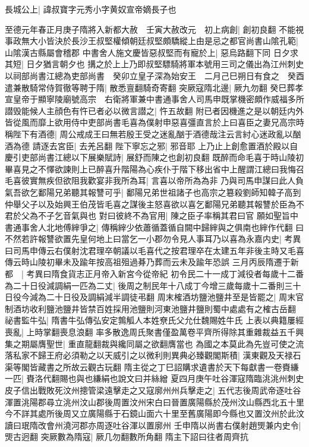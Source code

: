 長城公上|{
	諱叔寶字元秀小字黄奴宣帝嫡長子也}


至德元年春正月庚子隋將入新都大赦　壬寅大赦改元　初上病創|{
	創初良翻}
不能視事政無大小皆決於長沙王叔堅權傾朝廷叔堅頗驕縱上由是忌之都官尚書山隂孔範|{
	山隂漢古縣屬會稽郡}
中書舍人施文慶皆惡叔堅而有寵於上|{
	惡烏路翻下同}
日夕求其短|{
	日夕猶言朝夕也}
搆之於上上乃即叔堅驃騎將軍本號用三司之儀出為江州刺史以祠部尚書江總為吏部尚書　癸卯立皇子深為始安王　二月己巳朔日有食之　癸酉遣兼散騎常侍賀徹等聘于隋|{
	散悉亶翻騎奇寄翻}
突厥寇隋北邊|{
	厥九勿翻}
癸巳葬孝宣皇帝于顯寧陵廟號高宗　右衛將軍兼中書通事舍人司馬申既掌機密頗作威福多所譛毁能候人主顔色有忤已者必以微言譛之|{
	忤五故翻}
附已者因機進之是以朝廷内外皆從風而靡上欲用侍中吏部尚書毛喜為僕射申惡喜彊直言於上曰喜臣之妻兄高宗時稱陛下有酒德|{
	周公戒成王曰無若殷王受之迷亂酗于酒德哉注云言紂心迷政亂以酗酒為德}
請逐去宮臣|{
	去羌呂翻}
陛下寧忘之邪|{
	邪音耶}
上乃止上創愈置酒於殿以自慶引吏部尚書江總以下展樂賦詩|{
	展舒而陳之也創初良翻}
既醉而命毛喜于時山陵初畢喜見之不懌欲諫則上已醉喜升階陽為心疾仆于階下移出省中上醒謂江總曰我悔召毛喜彼實無疾但欲阻我歡宴非我所為耳|{
	言喜以帝所為為非}
乃與司馬申謀曰此人負氣吾欲乞鄱陽兄弟聽其報讐可乎|{
	鄱陽兄弟世祖諸子也高宗之簒殺劉師知韓子高到仲舉父子以及始興王伯茂皆毛喜之謀後主怒喜欲以喜乞鄱陽兄弟聽其報讐於臣為不君於父為不子乞音氣與也}
對曰彼終不為官用|{
	陳之臣子率稱其君曰官}
願如聖旨中書通事舍人北地傅縡爭之|{
	傳稱縡少依蕭循蓋循自闕中歸縡與之俱南也縡作代翻}
曰不然若許報讐欲置先皇何地上曰當乞一小郡勿令見人事耳乃以喜為永嘉内史|{
	考異曰司馬申傳云右僕射沈君理卒朝議以毛喜代之按君理卒在太建五年非後主時又毛喜傳云時山陵初畢未及踰年按高祖殂過朞乃葬而云未及踰年恐誤}
三月丙辰隋遷于新都　|{
	考異曰隋食貨志正月帝入新宮今從帝紀}
初令民二十一成丁減役者每歲十二番為二十日役減調絹一匹為二丈|{
	後周之制民年十八成丁今增三歲每歲十二番則三十日役今減為二十日役及調絹減半調徒弔翻}
周末榷酒坊鹽池鹽井至是皆罷之|{
	周末官制酒坊收利鹽池鹽井皆禁百姓採用池鹽則河東池鹽井鹽則蜀中處處有之榷古岳翻}
祕書監牛弘|{
	隋書牛弘傳弘安定鶉觚人本姓尞氏父允仕魏賜姓牛氏}
上表以典籍屢經喪亂|{
	上時掌翻喪息浪翻}
率多散逸周氏聚書僅盈萬卷平齊所得除其重雜裁益五千興集之期屬膺聖世|{
	重直龍翻裁與纔同屬之欲翻膺當也}
為國之本莫此為先豈可使之流落私家不歸王府必須勒之以天威引之以微利則異典必臻觀閣斯積|{
	漢東觀及天禄石渠等閣皆藏書之所故云觀古玩翻}
隋主從之丁巳詔購求遺書於天下每獻書一卷賚縑一匹|{
	賚洛代翻賜也與也縑絹也說文曰并絲繒}
夏四月庚午吐谷渾寇隋臨洮洮州刺史皮子信出戰敗死汶州摠管梁遠擊走之又寇廓州州兵擊走之|{
	五代志後周武帝逐吐谷渾置洮陽郡尋立洮州汶山郡後周置汶州宋白曰晉置廣陽縣於茂州汶山縣西北五十里今不詳其處所後周又立廣陽縣于石鏡山面六十里至舊廣陽即今縣也又置汶州於此汶讀曰珉隋改會州澆河郡亦周逐吐谷渾以置廓州}
壬申隋以尚書右僕射趙煚兼内史令|{
	煚古迥翻}
突厥數為隋寇|{
	厥几勿翻數所角翻}
隋主下詔曰往者周齊抗

